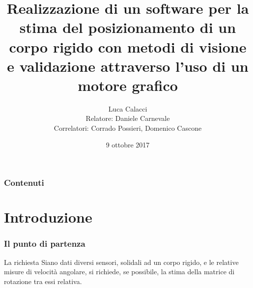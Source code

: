 \documentclass{beamer}
\title[Visual Observer]{Realizzazione di un software per la stima del posizionamento di un corpo rigido con metodi di visione e validazione attraverso l'uso di un motore grafico} %
\author{\texorpdfstring{Luca Calacci\\Relatore: Daniele Carnevale \\Correlatori: Corrado Possieri, Domenico Cascone}{Luca Calacci}}
\institute[Università Tor Vergata] %
{
Università degli Studi di Roma - Tor Vergata \\ %
\medskip
\textit{luca.calacci@gmail.com} %
}
\date{9 ottobre 2017}%
\begin{document}
\begin{frame}
\titlepage %
\end{frame}



\begin{frame}
\frametitle{Contenuti} %
\tableofcontents %
\end{frame}


\section{Introduzione} %

\begin{frame}
\frametitle{Il punto di partenza}
\begin{block}{La richiesta}
	Siano dati diversi sensori, solidali ad un corpo rigido, e le relative misure di velocità angolare, si richiede, se possibile, la stima della matrice di rotazione tra essi relativa. 
\end{block}
\end{frame}
\end{document}
